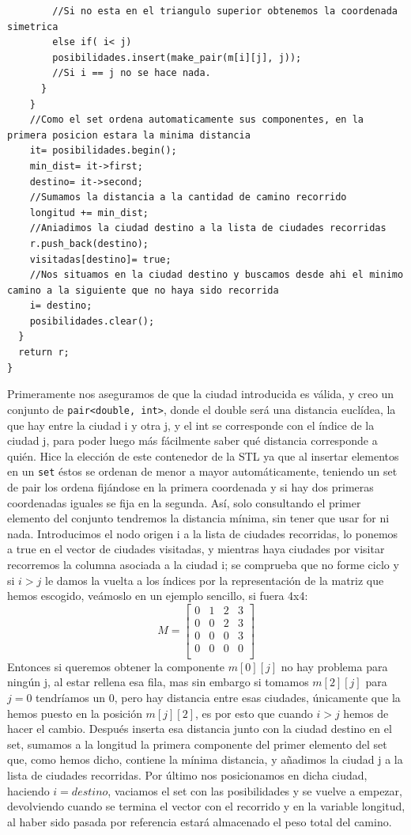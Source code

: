 \documentclass[12pt]{article}
\begin{document}
\begin{itemize}[wide, nosep, labelindent = 0pt, topsep = 1ex]
\begin{lstlisting}
        //Si no esta en el triangulo superior obtenemos la coordenada simetrica
        else if( i< j)
        posibilidades.insert(make_pair(m[i][j], j));
        //Si i == j no se hace nada.
      }
    }
    //Como el set ordena automaticamente sus componentes, en la primera posicion estara la minima distancia
    it= posibilidades.begin();
    min_dist= it->first;
    destino= it->second;
    //Sumamos la distancia a la cantidad de camino recorrido
    longitud += min_dist;
    //Aniadimos la ciudad destino a la lista de ciudades recorridas
    r.push_back(destino);
    visitadas[destino]= true;
    //Nos situamos en la ciudad destino y buscamos desde ahi el minimo camino a la siguiente que no haya sido recorrida
    i= destino;
    posibilidades.clear();
  }
  return r;
}
\end{lstlisting}
Primeramente nos aseguramos de que la ciudad introducida es válida, y creo un conjunto de \verb|pair<double, int>|, donde el double será una distancia euclídea, la que hay entre la ciudad i y otra j, y el int se corresponde con el índice de la ciudad j, para poder luego más fácilmente saber qué distancia corresponde a quién. Hice la elección de este contenedor de la STL ya que al insertar elementos en un \verb|set| éstos se ordenan de menor a mayor automáticamente, teniendo un set de pair los ordena fijándose en la primera coordenada y si hay dos primeras coordenadas iguales se fija en la segunda. Así, solo consultando el primer elemento del conjunto tendremos la distancia mínima, sin tener que usar for ni nada.
Introducimos el nodo origen i a la lista de ciudades recorridas, lo ponemos a true en el vector de ciudades visitadas, y mientras haya ciudades por visitar recorremos la columna asociada a la ciudad i; se comprueba que no forme ciclo y si $i>j$ le damos la vuelta a los índices por la representación de la matriz que hemos escogido, veámoslo en un ejemplo sencillo, si fuera 4x4: 
\[
   M=
  \left[ {\begin{array}{cccc}
   0 & 1 & 2 & 3 \\
   0 & 0 & 2 & 3 \\
   0 & 0 & 0 & 3 \\
   0 & 0 & 0 & 0 \\
  \end{array} } \right]
\]
Entonces si queremos obtener la componente $m[0][j]$ no hay problema para ningún j, al estar rellena esa fila, mas sin embargo si tomamos $m[2][j]$ para $j= 0$ tendríamos un 0, pero hay distancia entre esas ciudades, únicamente que la hemos puesto en la posición $m[j][2]$, es por esto que cuando $i>j$ hemos de hacer el cambio. Después inserta esa distancia junto con la ciudad destino en el set, sumamos a la longitud la primera componente del primer elemento del set que, como hemos dicho, contiene la mínima distancia, y añadimos la ciudad j a la lista de ciudades recorridas. Por último nos posicionamos en dicha ciudad, haciendo $i= destino$, vaciamos el set con las posibilidades y se vuelve a empezar, devolviendo cuando se termina el vector con el recorrido y en la variable longitud, al haber sido pasada por referencia estará almacenado el peso total del camino.  

\end{itemize}
\end{document}

